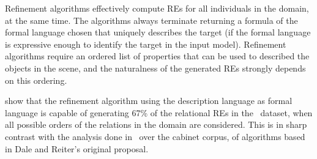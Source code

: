 Refinement algorithms %
effectively compute REs for all individuals in the domain, at the same time. The algorithms always terminate returning a formula of 
the formal language chosen that uniquely describes the target (if the 
formal language is expressive enough to identify the target in the input model). 
%
Refinement algorithms require an 
ordered list of properties that can be used to described the objects in the scene, and the naturalness of the generated REs strongly depends on this ordering. 

show that the refinement algorithm using the description language \el as formal language is capable of generating 67\% of 
the relational REs in the~\cite{viethen06:_algor_for_gener_refer_expres} dataset, when all possible orders of the relations in the domain are considered. This is in sharp contrast with the analysis 
done in~\cite{viethen06:_algor_for_gener_refer_expres} over the cabinet corpus, of algorithms based in Dale and Reiter's original proposal.    

